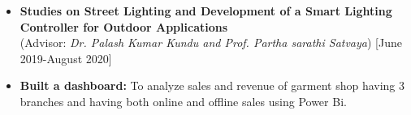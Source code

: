 \documentclass[11pt,a4paper]{moderncv}
\begin{document}
\begin{itemize}	
	
	\item\textbf{Studies on Street Lighting and
		Development of a Smart Lighting
		Controller for Outdoor
		Applications}\\
	 (Advisor: \textit{Dr. Palash Kumar Kundu and Prof. Partha
		sarathi Satvaya}) \hfill [June 2019-August 2020]%
	\item\textbf{Built a dashboard:} To analyze sales and revenue of garment shop having 3 branches and having both online and offline sales using Power Bi.
	
	
		
   
	
\end{itemize}
	
\end{document}
